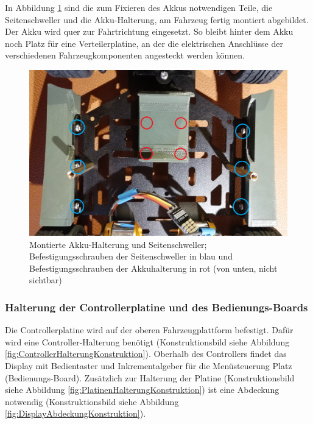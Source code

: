 In Abbildung \ref{fig:SchwellerAkkuHalterungMontage} sind die zum Fixieren des Akkus notwendigen Teile, die Seitenschweller und die Akku-Halterung, am Fahrzeug fertig montiert abgebildet. Der Akku wird quer zur Fahrtrichtung eingesetzt. So bleibt hinter dem Akku noch Platz für eine Verteilerplatine, an der die elektrischen Anschlüsse der verschiedenen Fahrzeugkomponenten angesteckt werden können.

\begin{figure}[H] %
\includegraphics[width=.7\textwidth]{sec2/images/3DAnbaukomponenten/Montagebilder/SchwellerAkkuHalterungMontage} 
\centering
\captionsetup{width=.95\textwidth}
\caption[Montierte Akku-Halterung und Seitenschweller]{Montierte Akku-Halterung und Seitenschweller; Befestigungsschrauben der Seitenschweller in blau und Befestigungsschrauben der Akkuhalterung in rot (von unten, nicht sichtbar)}\centering
\label{fig:SchwellerAkkuHalterungMontage}
\end{figure}

\newpage

\subsubsection{Halterung der Controllerplatine und des Bedienungs-Boards}\label{Sec2Sub2SubSub3}

Die Controllerplatine wird auf der oberen Fahrzeugplattform befestigt. Dafür wird eine Controller-Halterung benötigt (Konstruktionsbild siehe Abbildung \ref{fig:ControllerHalterungKonstruktion}). Oberhalb des Controllers findet das Display mit Bedientaster und Inkrementalgeber für die Menüsteuerung Platz (Bedienungs-Board). Zusätzlich zur Halterung der Platine (Konstruktionsbild siehe Abbildung \ref{fig:PlatinenHalterungKonstruktion}) ist eine Abdeckung notwendig (Konstruktionsbild siehe Abbildung \ref{fig:DisplayAbdeckungKonstruktion}).

